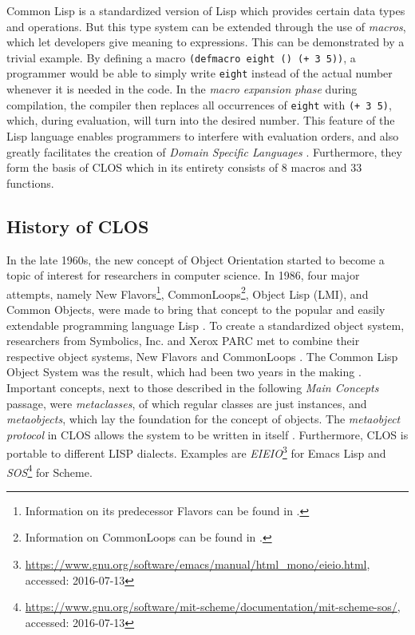 \documentclass[oribibl]{llncs}
\begin{document}
Common Lisp is a standardized version of Lisp which provides certain data types and operations. But this type system can be extended through the use of \emph{macros}, which let developers give meaning to expressions. This can be demonstrated by a trivial example. By defining a macro \texttt{(defmacro eight () (+ 3 5))}, a programmer would be able to simply write \texttt{eight} instead of the actual number whenever it is needed in the code. In the \emph{macro expansion phase} during compilation, the compiler then replaces all occurrences of \texttt{eight} with \texttt{(+ 3 5)}, which, during evaluation, will turn into the desired number. This feature of the Lisp language enables programmers to interfere with evaluation orders, and also greatly facilitates the creation of \emph{Domain Specific Languages} \cite{fowler2011domain-specific}. Furthermore, they form the basis of CLOS which in its entirety consists of 8 macros and 33 functions.


\subsection{History of CLOS}
\label{sec:history}

In the late 1960s, the new concept of Object Orientation started to become a topic of interest for researchers in computer science. In 1986, four major attempts, namely New Flavors\footnote{Information on its predecessor Flavors can be found in \cite{Moon:1986:OPF:28697.28698}.}, CommonLoops\footnote{Information on CommonLoops can be found in \cite{Bobrow:1986:CML:28697.28700}.}, Object Lisp (LMI), and Common Objects, were made to bring that concept to the popular and easily extendable programming language Lisp \cite{steele1993evolution}. To create a standardized object system, researchers from Symbolics, Inc. and Xerox PARC met to combine their respective object systems, New Flavors and CommonLoops \cite{demichiel1987common}. The Common Lisp Object System was the result, which had been two years in the making \cite{steele1993evolution}. Important concepts, next to those described in the following \emph{Main Concepts} passage, were \emph{metaclasses}, of which regular classes are just instances, and \emph{metaobjects}, which lay the foundation for the concept of objects\cite{kiczales1991art}. The \emph{metaobject protocol} in CLOS allows the system to be written in itself \cite{steele1993evolution}. Furthermore, CLOS is portable to different LISP dialects. Examples are \emph{EIEIO}\footnote{\url{https://www.gnu.org/software/emacs/manual/html_mono/eieio.html}, accessed: 2016-07-13} for Emacs Lisp and \emph{SOS}\footnote{\url{https://www.gnu.org/software/mit-scheme/documentation/mit-scheme-sos/}, accessed: 2016-07-13} for Scheme.
\end{document}
